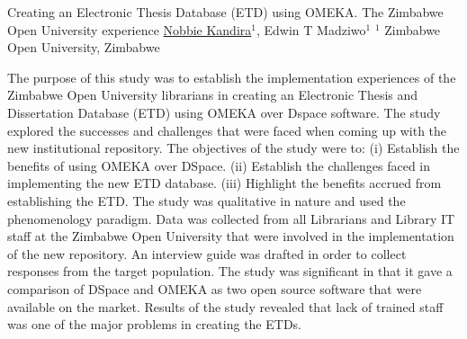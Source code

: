 
    \begin{abstract_online}{Creating an Electronic Thesis Database (ETD) using OMEKA. The Zimbabwe Open University experience}{%
        \underline{Nobbie Kandira}$^{1}$, Edwin T Madziwo$^{1}$}{%
        }{%
        $^1$ Zimbabwe Open University, Zimbabwe}
        
        The purpose of this study was to establish the implementation experiences of the Zimbabwe Open University librarians in creating an Electronic Thesis and Dissertation Database (ETD) using OMEKA over Dspace software. The study explored the successes and challenges that were faced when coming up with the new institutional repository. The objectives of the study were to: (i) Establish the benefits of using OMEKA over DSpace. (ii) Establish the challenges faced in implementing the new ETD database. (iii) Highlight the benefits accrued from establishing the ETD. The study was qualitative in nature and used the phenomenology paradigm. Data was collected from all Librarians and Library IT staff at the Zimbabwe Open University that were involved in the implementation of the new repository. An interview guide was drafted in order to collect responses from the target population. The study was significant in that it gave a comparison of DSpace and OMEKA as two open source software that were available on the market. Results of the study revealed that lack of trained staff was one of the major problems in creating the ETDs.
    
    \end{abstract_online}
    

